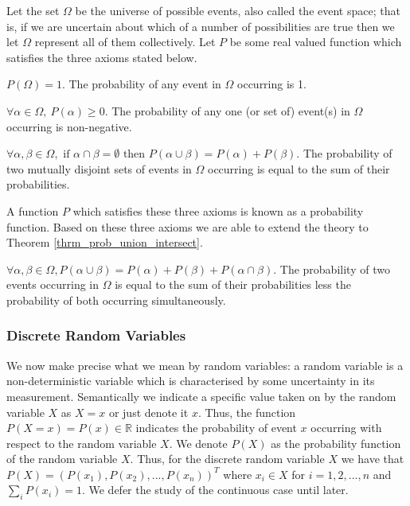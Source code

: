 Let the set $\Omega$ be the universe of possible events, also called the event space; that is, if we are uncertain about which of a number of possibilities are true then we let $\Omega$ represent all of them collectively. Let $P$ be some real valued function which satisfies the three axioms stated below.
\begin{ax}
$P(\Omega) = 1$. The probability of any event in $\Omega$ occurring is 1.
\end{ax}
\begin{ax}
$\forall \alpha \in \Omega,~P(\alpha) \geq 0$. The probability of any one (or set of) event(s) in $\Omega$ occurring is non-negative. 
\end{ax}
\begin{ax}
$\forall \alpha, \beta \in \Omega,\text{ if } \alpha \cap \beta = \emptyset \text{ then } P(\alpha \cup \beta) = P(\alpha) + P(\beta)$. The probability of two mutually disjoint sets of events in $\Omega$ occurring is equal to the sum of their probabilities.
\end{ax}
A function $P$ which satisfies these three axioms is known as a probability function. Based on these three axioms we are able to extend the theory to Theorem \ref{thrm_prob_union_intersect}.
\begin{thrm}
$\forall \alpha, \beta \in \Omega, P(\alpha \cup \beta) = P(\alpha) + P(\beta) + P(\alpha \cap \beta)$. The probability of two events occurring in $\Omega$ is equal to the sum of their probabilities less the probability of both occurring simultaneously.
\label{thrm_prob_union_intersect}
\end{thrm}

\subsubsection{Discrete Random Variables}

We now make precise what we mean by random variables: a random variable is a non-deterministic variable which is characterised by some uncertainty in its measurement. Semantically we indicate a specific value taken on by the random variable $X$ as $X=x$ or just denote it $x$. Thus, the function $P(X=x)=P(x) \in \mathbb{R}$ indicates the probability of event $x$ occurring with respect to the random variable $X$. We denote $P(X)$ as the probability function of the random variable $X$. Thus, for the discrete random variable $X$ we have that $P(X)=(P(x_1),P(x_2),...,P(x_n))^T$ where $x_i \in X$ for $i=1,2,..., n$ and $\sum_i P(x_i) =1$. We defer the study of the continuous case until later.

